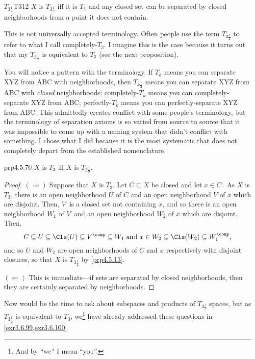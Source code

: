 \begin{dfn}{$T_{3\frac{1}{2}}$}{T312}
$X$ is \emph{$T_{3\frac{1}{2}}$} iff it is $T_1$ and any closed set can be separated by closed neighborhoods from a point it does not contain.
\begin{rmk}
This is not universally accepted terminology.  Often people use the term $T_{3\frac{1}{2}}$ to refer to what I call completely-$T_3$.  I imagine this is the case because it turns out that my $T_{3\frac{1}{2}}$ is equivalent to $T_3$ (see the next proposition).
\end{rmk}
\begin{rmk}
You will notice a pattern with the terminology.  If $T_k$ means you can separate XYZ from ABC with neighborhoods, then $T_{k\frac{1}{2}}$ means you can separate XYZ from ABC with \emph{closed} neighborhoods; completely-$T_k$ means you can completely-separate XYZ from ABC; perfectly-$T_k$ means you can perfectly-separate XYZ from ABC.  This admittedly creates conflict with some people's terminology, but the terminology of separation axioms is so varied from source to source that it was impossible to come up with a naming system that didn't conflict with something.  I chose what I did because it is the most systematic that does not completely depart from the established nomenclature.
\end{rmk}
\end{dfn}
\begin{prp}{}{prp4.5.70}
$X$ is $T_3$ iff $X$ is $T_{3\frac{1}{2}}$.
\begin{proof}
$(\Rightarrow )$ Suppose that $X$ is $T_3$.  Let $C\subseteq X$ be closed and let $x\in C^{\comp}$.  As $X$ is $T_3$, there is an open neighborhood $U$ of $C$ and an open neighborhood $V$ of $x$ which are disjoint.  Then, $V^{\comp}$ is a closed set not containing $x$, and so there is an open neighborhood $W_1$ of $V^{\comp}$ and an open neighborhood $W_2$ of $x$ which are disjoint.  Then,
\begin{equation}
C\subseteq U\subseteq \Cls (U)\subseteq V^{\comp}\subseteq W_1\text{ and }x\in W_2\subseteq \Cls (W_2)\subseteq W_1^{\comp},
\end{equation}
and so $U$ and $W_2$ are open neighborhoods of $C$ and $x$ respectively with disjoint closures, so that $X$ is $T_{3\frac{1}{2}}$ by \cref{prp4.5.13}.

\blankline
\noindent
$(\Leftarrow )$ This is immediate---if sets are separated by closed neighborhoods, then they are certainly separated by neighborhoods.
\end{proof}
\end{prp}
Now would be the time to ask about subspaces and products of $T_{3\frac{1}{2}}$ spaces, but as $T_{3\frac{1}{2}}$ is equivalent to $T_3$, we\footnote{And by ``we'' I mean ``you''.} have already addressed these questions in \cref{exr3.6.99,exr3.6.100}.

